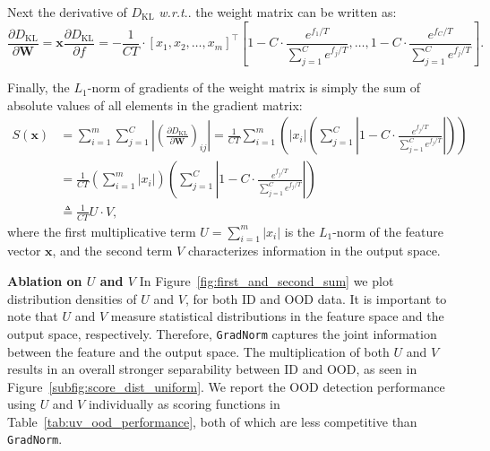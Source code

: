 \documentclass{article}
\makeatletter
\def\*#1{\mathbf{#1}}
\DeclareRobustCommand\onedot{\futurelet\@let@token\@onedot}
\def\@onedot{\ifx\@let@token.\else.\null\fi\xspace}
\def\wrt{\emph{w.r.t}\onedot} \def\dof{d.o.f\onedot}
\makeatother
\begin{document}
Next the derivative of $ D_\text{KL}$ \wrt the weight matrix can be written as:
\begin{equation*}
        \frac{\partial  D_\text{KL}}{\partial \mathbf{W}} = \mathbf{x} \frac{\partial  D_\text{KL}}{\partial f} 
        = -\frac{1}{CT} \cdot [x_1, x_2, \dots, x_m]^{\top}
        [1 - C \cdot \frac{e^{f_1 / T}}{\sum_{j=1}^C e^{{f_{j}} / T}}, \dots, 1 - C \cdot \frac{e^{f_C / T}}{\sum_{j=1}^C e^{{f_{j}} / T}}].
\end{equation*}

Finally, the $L_1$-norm of gradients of the weight matrix is simply the sum of absolute values of all elements in the gradient matrix:
\begin{equation}
    \begin{split}
        S(\*x) &= \sum_{i=1}^m \sum_{j=1}^C \left|\left(\frac{\partial  D_\text{KL}}{\partial \mathbf{W}}\right)_{ij}\right| = \frac{1}{CT} \sum_{i=1}^m \left( |x_i| \left(\sum_{j=1}^C \left|1 - C \cdot \frac{e^{f_j / T}}{\sum_{j=1}^C e^{{f_{j}} / T}}\right|\right)\right) \\
        &= \frac{1}{CT}  \left(\sum_{i=1}^m |x_i|\right) \left(\sum_{j=1}^C \left|1 - C \cdot \frac{e^{f_j / T}}{\sum_{j=1}^C e^{{f_{j}} / T}}\right|\right) \\
        & \triangleq \frac{1}{CT} U \cdot V,
    \end{split}
    \label{eq:decomp}
\end{equation}
where the first multiplicative term $U=\sum_{i=1}^m |x_i|$ is the $L_1$-norm of the feature vector $\*x$, and the second term $V$ characterizes information in the output space. 


\textbf{Ablation on $U$ and $V$} In Figure~\ref{fig:first_and_second_sum} we plot distribution densities of $U$ and $V$, for both ID and OOD data. It is important to note that $U$ and $V$ measure statistical distributions in the feature space and the output space, respectively. Therefore, \texttt{GradNorm} captures the joint information between the feature and the output space. The multiplication of both $U$ and $V$ results in an overall stronger separability between ID and OOD, as seen in Figure~\ref{subfig:score_dist_uniform}. We report the OOD detection performance using $U$ and $V$ individually as scoring functions in Table~\ref{tab:uv_ood_performance}, both of which are less competitive than \texttt{GradNorm}.
\end{document}
